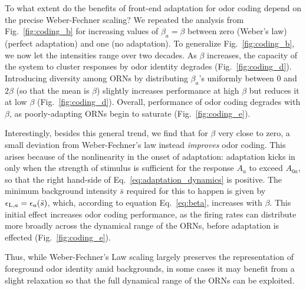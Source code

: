 \documentclass[10pt,prl,aps,showpacs,twocolumn,unsortedaddress,showkeys,linenumbers]{revtex4-1}
\begin{document}
{\color {blue} 
To what extent do the benefits of front-end adaptation for odor coding depend on the precise Weber-Fechner scaling? We repeated the analysis from Fig.~\ref{fig:coding_b} for increasing values of $\beta_a=\beta$ between zero (Weber's law) (perfect adaptation) and one (no adaptation). To generalize Fig.~\ref{fig:coding_b}, we now let the intensities range over two decades.  As $\beta$ increases, the capacity of the system to cluster responses by odor identity degrades (Fig.~\ref{fig:coding_d}). Introducing diversity among ORNs by distributing $\beta_a$'s uniformly between 0 and $2\beta$ (so that the mean is $\beta$) slightly increases performance at high $\beta$ but reduces it at low $\beta$ (Fig.~\ref{fig:coding_d}). Overall, performance of odor coding degrades with $\beta$, as poorly-adapting ORNs begin to saturate (Fig.~\ref{fig:coding_e}). 

Interestingly, besides this general trend, we find that for $\beta$ very close to zero, a small deviation from Weber-Fechner's law instead \textit{improves} odor coding. This arises because of the nonlinearity in the onset of adaptation: adaptation kicks in only when the strength of stimulus is sufficient for the response $A_a$ to exceed $A_{0a}$, so that the right hand-side of Eq.~\ref{eq:adaptation_dynamics} is positive. The minimum background intensity $\bar{s}$ required for this to happen is given by $\epsilon_{\textup{L}, a}=\epsilon_a(\bar{s})$, which, according to equation Eq.~\ref{eq:beta}, increases with $\beta$. This initial effect increases odor coding performance, as the firing rates can distribute more broadly across the dynamical range of the ORNs, before adaptation is effected (Fig.~\ref{fig:coding_e}). 


Thus, while Weber-Fechner's Law scaling largely preserves the representation of foreground odor identity amid backgrounds, in some cases it may benefit from a slight relaxation so that the full dynamical range of the ORNs can be exploited.
}


\end{document}
